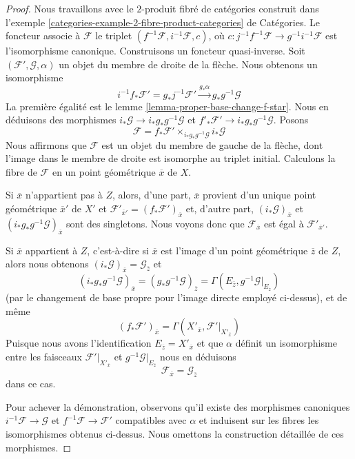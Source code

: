 \begin{proof}
Nous travaillons avec le $2$-produit fibré de catégories construit dans
l'exemple \ref{categories-example-2-fibre-product-categories} de Catégories.
Le foncteur associe à $\mathcal{F}$ le triplet
$(f^{-1}\mathcal{F}, i^{-1}\mathcal{F}, c)$, où
$c : j^{-1}f^{-1}\mathcal{F} \to g^{-1}i^{-1}\mathcal{F}$
est l'isomorphisme canonique. Construisons un foncteur quasi-inverse. Soit
$(\mathcal{F}', \mathcal{G}, \alpha)$ un objet
du membre de droite de la flèche.
Nous obtenons un isomorphisme
$$
i^{-1}f_*\mathcal{F}' = g_*j^{-1}\mathcal{F}'
\xrightarrow{g_*\alpha}
g_*g^{-1}\mathcal{G}
$$
La première égalité est le lemme \ref{lemma-proper-base-change-f-star}.
Nous en déduisons des morphismes
$i_*\mathcal{G} \to i_*g_*g^{-1}\mathcal{G}$
et $f'_*\mathcal{F}' \to i_*g_*g^{-1}\mathcal{G}$. Posons
$$
\mathcal{F} = f_*\mathcal{F}' \times_{i_*g_*g^{-1}\mathcal{G}} i_*\mathcal{G}
$$
Nous affirmons que $\mathcal{F}$ est un objet du membre de gauche
de la flèche, dont l'image dans le membre de droite est isomorphe au
triplet initial. Calculons la fibre de $\mathcal{F}$
en un point géométrique $\overline{x}$ de $X$.

\medskip\noindent
Si $\overline{x}$ n'appartient pas
à $Z$, alors, d'une part, $\overline{x}$ provient d'un unique
point géométrique $\overline{x}'$ de $X'$ et
$\mathcal{F}'_{\overline{x}'} = (f_*\mathcal{F}')_{\overline{x}}$
et, d'autre part, $(i_*\mathcal{G})_{\overline{x}}$
et $(i_*g_*g^{-1}\mathcal{G})_{\overline{x}}$ sont des singletons.
Nous voyons donc que $\mathcal{F}_{\overline{x}}$ est égal à
$\mathcal{F}'_{\overline{x}'}$.

\medskip\noindent
Si $\overline{x}$ appartient à $Z$, c'est-à-dire si $\overline{x}$ est l'image d'un
point géométrique $\overline{z}$ de $Z$, alors nous obtenons
$(i_*\mathcal{G})_{\overline{x}} = \mathcal{G}_{\overline{z}}$
et
$$
(i_*g_*g^{-1}\mathcal{G})_{\overline{x}} =
(g_*g^{-1}\mathcal{G})_{\overline{z}} =
\Gamma(E_{\overline{z}}, g^{-1}\mathcal{G}|_{E_{\overline{z}}})
$$
(par le changement de base propre pour l'image directe employé ci-dessus),
et de même
$$
(f_*\mathcal{F}')_{\overline{x}} =
\Gamma(X'_{\overline{x}}, \mathcal{F}'|_{X'_{\overline{x}}})
$$
Puisque nous avons l'identification
$E_{\overline{z}} = X'_{\overline{x}}$ et que $\alpha$
définit un isomorphisme entre les faisceaux
$\mathcal{F}'|_{X'_{\overline{x}}}$ et
$g^{-1}\mathcal{G}|_{E_{\overline{z}}}$
nous en déduisons
$$
\mathcal{F}_{\overline{x}} = \mathcal{G}_{\overline{z}}
$$
dans ce cas.

\medskip\noindent
Pour achever la démonstration, observons qu'il existe des morphismes canoniques
$i^{-1}\mathcal{F} \to \mathcal{G}$ et $f^{-1}\mathcal{F} \to \mathcal{F}'$
compatibles avec $\alpha$ et induisent sur les fibres les isomorphismes
obtenus ci-dessus. Nous omettons la construction détaillée de ces morphismes.
\end{proof}

